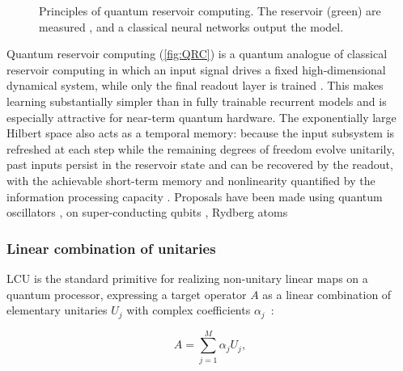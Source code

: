 \documentclass[aps,10pt,groupedaddress,prx,superscriptaddress,twocolumn,balancelastpage, tightenlines]{revtex4-2}
\theoremstyle{plain}  %
\begin{document}
\begin{figure}[t!]
    \centering
    
    \caption{Principles of quantum reservoir computing. The reservoir (green) are measured , and a classical neural networks output the model.}
    \label{fig:QRC}
\end{figure}

Quantum reservoir computing (\autoref{fig:QRC}) is a quantum analogue of classical reservoir computing \cite{jaeger_harnessing_2004, maass_real-time_2002} in which an input signal drives a fixed high-dimensional dynamical system, while only the final readout layer is trained \cite{fujii_harnessing_2017, nakajima_boosting_2019, kutvonen_optimizing_2020}. This makes learning substantially simpler than in fully trainable recurrent models and is especially attractive for near-term quantum hardware. The exponentially large Hilbert space also acts as a temporal memory: because the input subsystem is refreshed at each step while the remaining degrees of freedom evolve unitarily, past inputs persist in the reservoir state and can be recovered by the readout, with the achievable short-term memory and nonlinearity quantified by the information processing capacity \cite{Mart_nez_Pe_a_2020, suzuki_natural_2022}. Proposals have been made using quantum oscillators \cite{dudas2023quantum, govia_quantum_2021}, on super-conducting qubits \cite{suzuki_natural_2022}, Rydberg atoms \cite{bravo_quantum_2022}


\subsubsection{Linear combination of unitaries}


\Gls{LCU} is the standard primitive for realizing non-unitary linear maps on a quantum processor, expressing a target operator $A$ as a linear combination of elementary unitaries $U_j$ with complex coefficients $\alpha_j$~\cite{childs2012hamiltonian, berry2015simulating}:

\begin{equation}
A = \sum_{j=1}^{M} \alpha_j U_j,
\end{equation}
\end{document}
